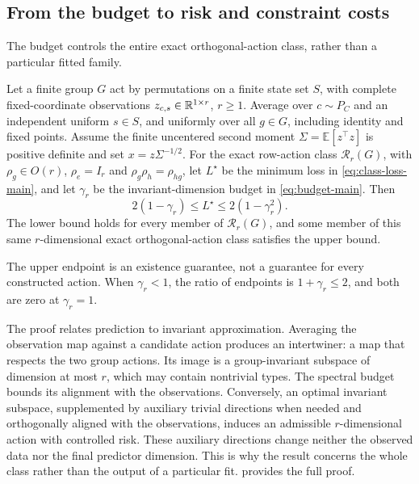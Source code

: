 \subsection{From the budget to risk and constraint costs}
The budget controls the entire exact orthogonal-action class, rather than a particular fitted family.
\begin{spectraltheorem}
\label{sp:main}
Let a finite group $G$ act by permutations on a finite state set $S$, with complete fixed-coordinate observations $z_{c,s}\in\mathbb{R}^{1\times r}$, $r\ge1$. Average over $c\sim P_C$ and an independent uniform $s\in S$, and uniformly over all $g\in G$, including identity and fixed points. Assume the finite uncentered second moment $\Sigma=\mathbb E[z^\top z]$ is positive definite and set $x=z\Sigma^{-1/2}$. For the exact row-action class $\mathcal R_r(G)$, with $\rho_g\in O(r)$, $\rho_e=I_r$ and $\rho_g\rho_h=\rho_{hg}$, let $L^\star$ be the minimum loss in \cref{eq:class-loss-main}, and let $\gamma_r$ be the invariant-dimension budget in \cref{eq:budget-main}. Then
\begin{equation}
 \boxed{2(1-\gamma_r)\le L^\star\le2(1-\gamma_r^2).}
 \label{eq:main-risk-bound}
\end{equation}
The lower bound holds for every member of $\mathcal R_r(G)$, and some member of this same $r$-dimensional exact orthogonal-action class satisfies the upper bound.
\end{spectraltheorem}
The upper endpoint is an existence guarantee, not a guarantee for every constructed action. When $\gamma_r<1$, the ratio of endpoints is $1+\gamma_r\le2$, and both are zero at $\gamma_r=1$.

The proof relates prediction to invariant approximation. Averaging the observation map against a candidate action produces an intertwiner: a map that respects the two group actions. Its image is a group-invariant subspace of dimension at most $r$, which may contain nontrivial types. The spectral budget bounds its alignment with the observations. Conversely, an optimal invariant subspace, supplemented by auxiliary trivial directions when needed and orthogonally aligned with the observations, induces an admissible $r$-dimensional action with controlled risk. These auxiliary directions change neither the observed data nor the final predictor dimension. This is why the result concerns the whole class rather than the output of a particular fit.  provides the full proof.

